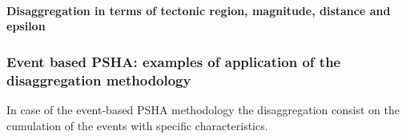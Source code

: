 %
%
\paragraph{Disaggregation in terms of tectonic region, magnitude,
distance and epsilon}


%
\subsubsection{Event based PSHA: examples of application of the 
disaggregation methodology}
%
In case of the event-based PSHA methodology the disaggregation consist 
on the cumulation of the events with specific characteristics. 

